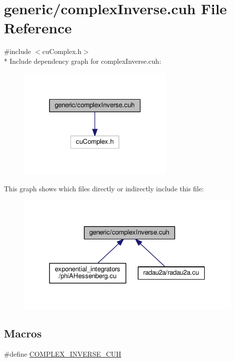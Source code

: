 \hypertarget{complexInverse_8cuh}{}\section{generic/complex\+Inverse.cuh File Reference}
\label{complexInverse_8cuh}
{\ttfamily \#include $<$cu\+Complex.\+h$>$}\\*
Include dependency graph for complex\+Inverse.\+cuh\+:\nopagebreak
\begin{figure}[H]
\begin{center}
\leavevmode
\includegraphics[width=219pt]{complexInverse_8cuh__incl}
\end{center}
\end{figure}
This graph shows which files directly or indirectly include this file\+:\nopagebreak
\begin{figure}[H]
\begin{center}
\leavevmode
\includegraphics[width=318pt]{complexInverse_8cuh__dep__incl}
\end{center}
\end{figure}
\subsection*{Macros}
\begin{DoxyCompactItemize}
\item 
\#define \hyperlink{complexInverse_8cuh_a31ab82ad484c489345092056a631004d}{C\+O\+M\+P\+L\+E\+X\+\_\+\+I\+N\+V\+E\+R\+S\+E\+\_\+\+C\+UH}
\end{DoxyCompactItemize}
